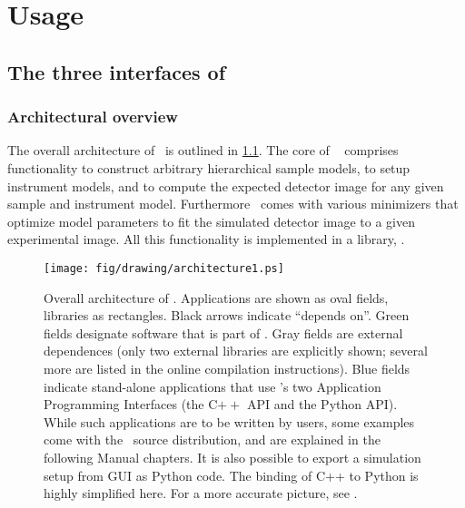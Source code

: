 
\part{Usage}\label{PUSE}

\chapter{The three interfaces of \BornAgain}  \label{sec:API3}

\section{Architectural overview}

The overall architecture of \BornAgain\ is outlined in \cref{Farch1}.
The core of \BornAgain\
comprises functionality to construct arbitrary hierarchical sample models,
to setup instrument models,
and to compute the expected detector image for any given sample and instrument model.
Furthermore \BornAgain\ comes with various minimizers that optimize model parameters
to fit the simulated detector image to a given experimental image.
All this functionality is implemented in a library, .

\begin{figure}[tbh]
\begin{center}
\texttt{[image: fig/drawing/architecture1.ps]}
\end{center}
\caption{Overall architecture of \BornAgain.
%
Applications are shown as oval fields, libraries as rectangles.
Black arrows indicate ``depends on''.
Green fields designate software that is part of \BornAgain.
Gray fields are external dependences
(only two external libraries are explicitly shown;
several more are listed in the online compilation instructions).
Blue fields indicate stand-alone applications that use \BornAgain's
two Application Programming Interfaces (the C$++$ API and the Python API).
\index{C++!using BornAgain from}
While such applications are to be written by users,
some examples come with the \BornAgain\ source distribution,
and are explained in the following Manual chapters.
It is also possible to export a simulation setup from GUI as Python code.
The binding of C++ to Python is highly simplified here.
For a more accurate picture, see .}
\label{Farch1}
\end{figure}

